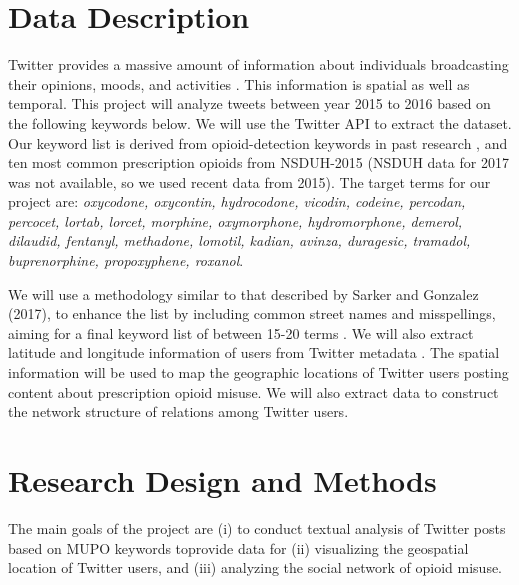 \documentclass[sigconf]{acmart}
\begin{document}
\section{Data Description} 

Twitter provides a massive amount of information about individuals 
broadcasting their opinions, moods, and activities \cite{widener14}. This 
information is spatial as well as temporal. This project will analyze tweets 
between year 2015 to 2016 based on the following keywords below. We will use 
the Twitter API to extract the dataset. Our keyword list is derived from 
opioid-detection keywords in past research \cite{chary17, mackey17, lord11}, 
and ten most common prescription opioids from NSDUH-2015 \cite{shiverick17}
(NSDUH data for 2017 was not available, so we used recent data from 2015). 
The target terms for our project are: \emph{
oxycodone, oxycontin, hydrocodone, vicodin, codeine, percodan, 
percocet, lortab, lorcet, morphine, oxymorphone, hydromorphone, 
demerol, dilaudid, fentanyl, methadone, lomotil, kadian, avinza, 
duragesic, tramadol, buprenorphine, propoxyphene, roxanol}.

We will use a methodology similar to that described by Sarker and Gonzalez 
(2017), to enhance the list by including common street names and misspellings, 
aiming for a final keyword list of between 15-20 terms \cite{sarker17}. We 
will also extract latitude and longitude information of users from Twitter 
metadata \cite{twittergeo}. The spatial information will be used to map the 
geographic locations of Twitter users posting content about prescription
opioid misuse. We will also extract data to construct the network structure 
of relations among Twitter users. 


\section{Research Design and Methods}
The main goals of the project are (i) to conduct textual analysis of Twitter 
posts based on MUPO keywords toprovide data for (ii) visualizing the geospatial 
location of Twitter users, and (iii) analyzing the social network of opioid 
misuse.  
\end{document}
